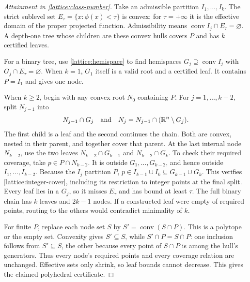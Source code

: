 \begin{proof}[Attainment in \cref{lattice:class-number}]
Take an admissible partition $I_1,\ldots,I_k$. The strict sublevel set
$E_\tau=\{x:\phi(x)<\tau\}$ is convex; for $\tau=+\infty$ it is the
effective domain of the proper projected function. Admissibility means
$\operatorname{conv}I_j\cap E_\tau=\varnothing$. A depth-one tree whose
children are these convex hulls covers $P$ and has $k$ certified leaves.

For a binary tree, use \cref{lattice:hemispace} to find hemispaces
$G_j\supseteq\operatorname{conv}I_j$ with $G_j\cap E_\tau=\varnothing$.
When $k=1$, $G_1$ itself is a valid root and a certified leaf. It contains
$P=I_1$ and gives one node.

When $k\ge2$, begin with any convex root $N_0$ containing $P$. For
$j=1,\ldots,k-2$, split $N_{j-1}$ into
\begin{equation*}
 N_{j-1}\cap G_j\quad\text{and}\quad
 N_j=N_{j-1}\cap(\mathbb{R}^n\setminus G_j).
\end{equation*}
The first child is a leaf and the second continues the chain. Both are
convex, nested in their parent, and together cover that parent. At the
last internal node $N_{k-2}$, use the two leaves
$N_{k-2}\cap G_{k-1}$ and $N_{k-2}\cap G_k$. To check their required
coverage, take $p\in P\cap N_{k-2}$. It is outside $G_1,\ldots,G_{k-2}$,
and hence outside $I_1,\ldots,I_{k-2}$. Because the $I_j$ partition $P$,
$p\in I_{k-1}\cup I_k\subseteq G_{k-1}\cup G_k$. This verifies
\eqref{lattice:integer-cover}, including its restriction to integer
points at the final split. Every leaf lies in a $G_j$, so it misses
$E_\tau$ and has bound at least $\tau$. The full binary chain has $k$
leaves and $2k-1$ nodes. If a constructed leaf were empty of required
points, routing to the others would contradict minimality of $k$.

For finite $P$, replace each node set $S$ by
$S'=\operatorname{conv}(S\cap P)$. This is a polytope or the empty set.
Convexity gives $S'\subseteq S$, while
$S'\cap P=S\cap P$: one inclusion follows from $S'\subseteq S$, the
other because every point of $S\cap P$ is among the hull's generators.
Thus every node's required points and every coverage relation are
unchanged. Effective sets only shrink, so leaf bounds cannot decrease.
This gives the claimed polyhedral certificate.
\end{proof}

